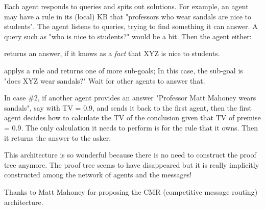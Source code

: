 Each agent responds to queries and spits out solutions. For example, an agent may have a rule in its (local) KB that "professors who wear sandals are nice to students".  The agent listens to queries, trying to find something it can answer.  A query such as "who is nice to students?" would be a hit.  Then the agent either:

\begin{compactenum-}
\item returns an answer, if it knows as a \textit{fact} that XYZ is nice to students.
\item applys a rule and returns one of more sub-goals;  In this case, the sub-goal is "does XYZ wear sandals?"  Wait for other agents to answer that.
\end{compactenum-}

In case \#2, if another agent provides an answer "Professor Matt Mahoney wears sandals", say with TV = 0.9, and sends it back to the first agent, then the first agent decides how to calculate the TV of the conclusion given that TV of premise = 0.9.  The only calculation it needs to perform is for the rule that it owns.  Then it returns the answer to the asker.

This architecture is so wonderful because there is no need to construct the proof tree anymore. The proof tree seems to have disappeared but it is really implicitly constructed among the network of agents and the messages!

Thanks to Matt Mahoney for proposing the CMR (competitive message routing) architecture.
